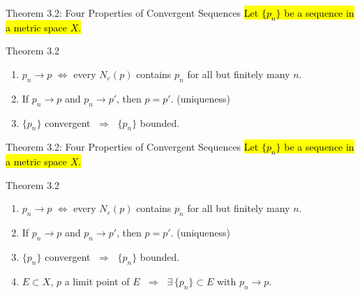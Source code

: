 \documentclass[aspectratio=169,12pt,t]{beamer}
\begin{document}
{%
\begin{frame}{Theorem 3.2: Four Properties of Convergent Sequences}
  \hl{Let $\{p_n\}$ be a sequence in a metric space $X$.}
  \begin{thmblock}{Theorem 3.2}
    \begin{enumerate}
      \item[(a)] $p_n \to p$ $\iff$ every $N_\varepsilon(p)$ contains $p_n$ for all but finitely many $n$.
      \item[(b)] If $p_n \to p$ and $p_n \to p'$, then $p = p'$. \; (\alert{uniqueness})
      \item[(c)] $\{p_n\}$ convergent $\;\Longrightarrow\;$ $\{p_n\}$ \alert{bounded}.
    \end{enumerate}
  \end{thmblock}

\end{frame}

\begin{frame}{Theorem 3.2: Four Properties of Convergent Sequences}
  \hl{Let $\{p_n\}$ be a sequence in a metric space $X$.}
  \begin{thmblock}{Theorem 3.2}
    \begin{enumerate}
      \item[(a)] $p_n \to p$ $\iff$ every $N_\varepsilon(p)$ contains $p_n$ for all but finitely many $n$.
      \item[(b)] If $p_n \to p$ and $p_n \to p'$, then $p = p'$. \; (\alert{uniqueness})
      \item[(c)] $\{p_n\}$ convergent $\;\Longrightarrow\;$ $\{p_n\}$ \alert{bounded}.
      \item[(d)] $E \subset X$, $p$ a limit point of $E$ $\;\Longrightarrow\;$ $\exists\, \{p_n\} \subset E$ with $p_n \to p$.
    \end{enumerate}
  \end{thmblock}

\end{frame}

}
\end{document}

